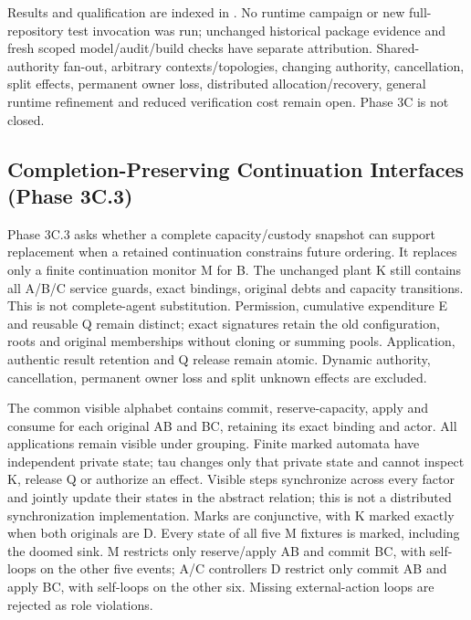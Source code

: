 \documentclass[11pt,a4paper]{article}
\theoremstyle{definition}
\theoremstyle{remark}
\begin{document}
Results and qualification are indexed in . No runtime campaign or new full-repository test invocation was run; unchanged historical package evidence and fresh scoped model/audit/build checks have separate attribution. Shared-authority fan-out, arbitrary contexts/topologies, changing authority, cancellation, split effects, permanent owner loss, distributed allocation/recovery, general runtime refinement and reduced verification cost remain open. Phase 3C is not closed.

\subsection{Completion-Preserving Continuation Interfaces (Phase 3C.3)}

Phase 3C.3 asks whether a complete capacity/custody snapshot can support replacement when a retained continuation constrains future ordering. It replaces only a finite continuation monitor M for B. The unchanged plant K still contains all A/B/C service guards, exact bindings, original debts and capacity transitions. This is not complete-agent substitution. Permission, cumulative expenditure E and reusable Q remain distinct; exact signatures retain the old configuration, roots and original memberships without cloning or summing pools. Application, authentic result retention and Q release remain atomic. Dynamic authority, cancellation, permanent owner loss and split unknown effects are excluded.

The common visible alphabet contains commit, reserve-capacity, apply and consume for each original AB and BC, retaining its exact binding and actor. All applications remain visible under grouping. Finite marked automata have independent private state; tau changes only that private state and cannot inspect K, release Q or authorize an effect. Visible steps synchronize across every factor and jointly update their states in the abstract relation; this is not a distributed synchronization implementation. Marks are conjunctive, with K marked exactly when both originals are D. Every state of all five M fixtures is marked, including the doomed sink. M restricts only reserve/apply AB and commit BC, with self-loops on the other five events; A/C controllers D restrict only commit AB and apply BC, with self-loops on the other six. Missing external-action loops are rejected as role violations.
\end{document}
